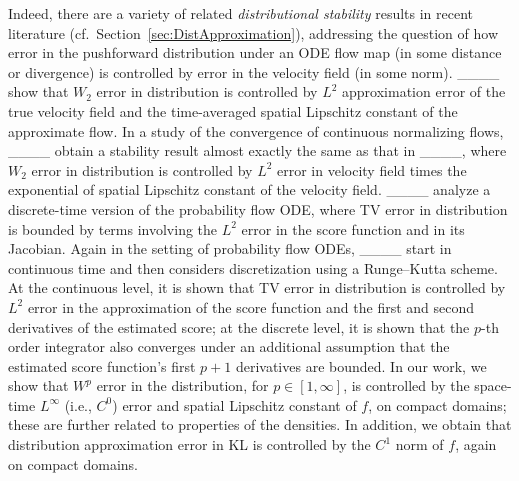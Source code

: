         

Indeed, there are a variety of  related \textit{distributional stability} results in recent literature (cf.\ Section~\ref{sec:DistApproximation}), addressing the question of how error in the pushforward distribution under an ODE flow map (in some distance or divergence) is controlled by error in the velocity field (in some norm). ____ show that $W_2$ error in distribution is controlled by $L^2$ approximation error of the true velocity field and the time-averaged spatial Lipschitz constant of the approximate flow. In a study of the convergence of continuous normalizing flows, ____ obtain a stability result almost exactly the same as that in ____, where $W_2$ error in distribution is controlled by $L^2$ error in velocity field times the exponential of spatial Lipschitz constant of the velocity field.
    ____ analyze a discrete-time version of the probability flow ODE, where TV error in distribution is bounded by terms involving the $L^2$ error in the score function and in its Jacobian. Again in the setting of probability flow ODEs, ____ start in continuous time and then considers discretization using a Runge--Kutta scheme. At the continuous level, it is shown that TV error in distribution is controlled by 
    $L^2$ error in the approximation of the score function and
    the first and second
derivatives of the estimated score; at the discrete level, it is shown that the $p$-th order integrator also converges under an additional assumption that the estimated score function’s first $p + 1$ derivatives are bounded. In our work, we show that $W^p$ error in the distribution, for $p \in [1, \infty]$, is controlled by the space-time $L^\infty$ (i.e., $C^0$) error and spatial Lipschitz constant of $f$, on compact domains; these are further related to properties of the densities. In addition, we obtain that distribution approximation error in KL is controlled by the $C^1$ norm of $f$, again on compact domains.
    
    
    
    

        
